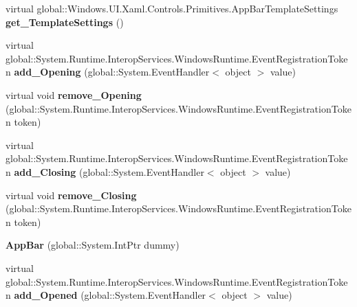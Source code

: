 \begin{DoxyCompactItemize}
virtual global\+::\+Windows.\+U\+I.\+Xaml.\+Controls.\+Primitives.\+App\+Bar\+Template\+Settings {\bfseries get\+\_\+\+Template\+Settings} ()
\item 
\mbox{\label{class_windows_1_1_u_i_1_1_xaml_1_1_controls_1_1_app_bar_a355e1e4a38bea8069ad912132936c3e5}} 
virtual global\+::\+System.\+Runtime.\+Interop\+Services.\+Windows\+Runtime.\+Event\+Registration\+Token {\bfseries add\+\_\+\+Opening} (global\+::\+System.\+Event\+Handler$<$ object $>$ value)
\item 
\mbox{\label{class_windows_1_1_u_i_1_1_xaml_1_1_controls_1_1_app_bar_a1912d3027c4521c8dcda380a853d656e}} 
virtual void {\bfseries remove\+\_\+\+Opening} (global\+::\+System.\+Runtime.\+Interop\+Services.\+Windows\+Runtime.\+Event\+Registration\+Token token)
\item 
\mbox{\label{class_windows_1_1_u_i_1_1_xaml_1_1_controls_1_1_app_bar_a669f99f9098da8948468675637292c38}} 
virtual global\+::\+System.\+Runtime.\+Interop\+Services.\+Windows\+Runtime.\+Event\+Registration\+Token {\bfseries add\+\_\+\+Closing} (global\+::\+System.\+Event\+Handler$<$ object $>$ value)
\item 
\mbox{\label{class_windows_1_1_u_i_1_1_xaml_1_1_controls_1_1_app_bar_a4c8dc6e33234645dfc8de750f6172acc}} 
virtual void {\bfseries remove\+\_\+\+Closing} (global\+::\+System.\+Runtime.\+Interop\+Services.\+Windows\+Runtime.\+Event\+Registration\+Token token)
\item 
\mbox{\label{class_windows_1_1_u_i_1_1_xaml_1_1_controls_1_1_app_bar_a7504764229ad22d4e22e97ea76d33d92}} 
{\bfseries App\+Bar} (global\+::\+System.\+Int\+Ptr dummy)
\item 
\mbox{\label{class_windows_1_1_u_i_1_1_xaml_1_1_controls_1_1_app_bar_ad5f3931660e32abe22fcee131b86c49d}} 
virtual global\+::\+System.\+Runtime.\+Interop\+Services.\+Windows\+Runtime.\+Event\+Registration\+Token {\bfseries add\+\_\+\+Opened} (global\+::\+System.\+Event\+Handler$<$ object $>$ value)

\end{DoxyCompactItemize}
